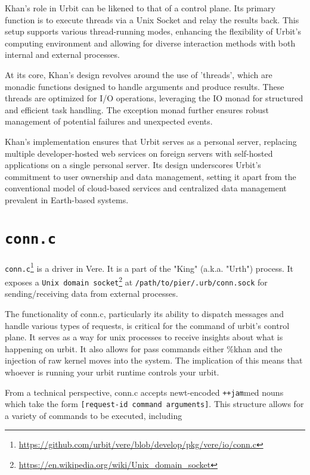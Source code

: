 \documentclass[twoside]{article}
\begin{document}
Khan's role in Urbit can be likened to that of a control plane. Its primary function is to execute threads via a Unix Socket and relay the results back. This setup supports various thread-running modes, enhancing the flexibility of Urbit's computing environment and allowing for diverse interaction methods with both internal and external processes.

At its core, Khan's design revolves around the use of 'threads', which are monadic functions designed to handle arguments and produce results. These threads are optimized for I/O operations, leveraging the IO monad for structured and efficient task handling. The exception monad further ensures robust management of potential failures and unexpected events.

Khan's implementation ensures that Urbit serves as a personal server, replacing multiple developer-hosted web services on foreign servers with self-hosted applications on a single personal server. Its design underscores Urbit's commitment to user ownership and data management, setting it apart from the conventional model of cloud-based services and centralized data management prevalent in Earth-based systems.

\section{\texttt{conn.c}} %

\texttt{conn.c}\footnote{\url{https://github.com/urbit/vere/blob/develop/pkg/vere/io/conn.c}} is a driver in Vere. It is a part of the "King" (a.k.a. "Urth") process. It exposes a \texttt{Unix domain socket}\footnote{\url{https://en.wikipedia.org/wiki/Unix_domain_socket}} at \texttt{/path/to/pier/.urb/conn.sock} for sending/receiving data from external processes.

The functionality of conn.c, particularly its ability to dispatch messages and handle various types of requests, is critical for the command of urbit's control plane. It serves as a way for unix processes to receive insights about what is happening on urbit. It also allows for pass commands either \%khan and the injection of raw kernel moves into the system. The implication of this means that whoever is running your urbit runtime controls your urbit. 

From a technical perspective, conn.c accepts newt-encoded \texttt{++jam}med nouns which take the form \texttt{[request-id command arguments]}. This structure allows for a variety of commands to be executed, including 
\end{document}
